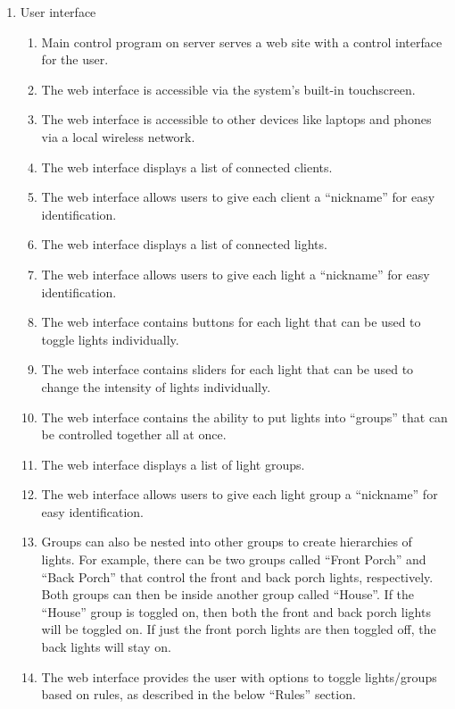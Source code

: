\begin{enumerate}
    \item User interface
        \begin{enumerate}
            \item Main control program on server serves a web site with a
                control interface for the user.
            \item The web interface is accessible via the system's built-in
                touchscreen.
            \item The web interface is accessible to other devices like laptops
                and phones via a local wireless network.
            \item The web interface displays a list of connected clients.
            \item The web interface allows users to give each client a
                ``nickname'' for easy identification.
            \item The web interface displays a list of connected lights.
            \item The web interface allows users to give each light a
                ``nickname'' for easy identification.
            \item The web interface contains buttons for each light that can be
                used to toggle lights individually.
            \item The web interface contains sliders for each light that can be
                used to change the intensity of lights individually.
            \item The web interface contains the ability to put lights into
                ``groups'' that can be controlled together all at once.
            \item The web interface displays a list of light groups.
            \item The web interface allows users to give each light group a
                ``nickname'' for easy identification.
            \item Groups can also be nested into other groups to create
                hierarchies of lights.  For example, there can be two groups
                called ``Front Porch'' and ``Back Porch'' that control the
                front and back porch lights, respectively.  Both groups can
                then be inside another group called ``House''.  If the
                ``House'' group is toggled on, then both the front and back
                porch lights will be toggled on.  If just the front porch
                lights are then toggled off, the back lights will stay on.
            \item The web interface provides the user with options to toggle
                lights/groups based on rules, as described in the below
                ``Rules'' section.
        \end{enumerate}


\end{enumerate}
